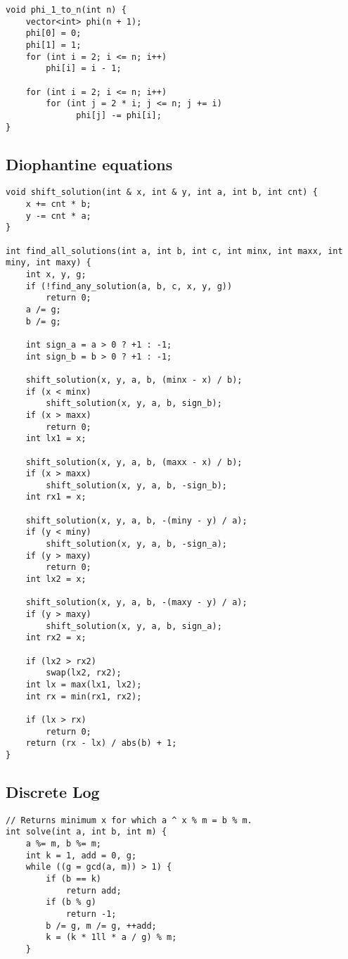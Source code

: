 \documentclass[10pt]{article}
\begin{document}
\begin{multicols*}{2}
\begin{lstlisting}[style=compactcpp]
void phi_1_to_n(int n) {
    vector<int> phi(n + 1);
    phi[0] = 0;
    phi[1] = 1;
    for (int i = 2; i <= n; i++)
        phi[i] = i - 1;

    for (int i = 2; i <= n; i++)
        for (int j = 2 * i; j <= n; j += i)
              phi[j] -= phi[i];
}
\end{lstlisting}

\subsection{Diophantine equations}

\begin{lstlisting}[style=compactcpp]
void shift_solution(int & x, int & y, int a, int b, int cnt) {
    x += cnt * b;
    y -= cnt * a;
}

int find_all_solutions(int a, int b, int c, int minx, int maxx, int miny, int maxy) {
    int x, y, g;
    if (!find_any_solution(a, b, c, x, y, g))
        return 0;
    a /= g;
    b /= g;

    int sign_a = a > 0 ? +1 : -1;
    int sign_b = b > 0 ? +1 : -1;

    shift_solution(x, y, a, b, (minx - x) / b);
    if (x < minx)
        shift_solution(x, y, a, b, sign_b);
    if (x > maxx)
        return 0;
    int lx1 = x;

    shift_solution(x, y, a, b, (maxx - x) / b);
    if (x > maxx)
        shift_solution(x, y, a, b, -sign_b);
    int rx1 = x;

    shift_solution(x, y, a, b, -(miny - y) / a);
    if (y < miny)
        shift_solution(x, y, a, b, -sign_a);
    if (y > maxy)
        return 0;
    int lx2 = x;

    shift_solution(x, y, a, b, -(maxy - y) / a);
    if (y > maxy)
        shift_solution(x, y, a, b, sign_a);
    int rx2 = x;

    if (lx2 > rx2)
        swap(lx2, rx2);
    int lx = max(lx1, lx2);
    int rx = min(rx1, rx2);

    if (lx > rx)
        return 0;
    return (rx - lx) / abs(b) + 1;
}
\end{lstlisting}

\subsection{Discrete Log}

\begin{lstlisting}[style=compactcpp]
// Returns minimum x for which a ^ x % m = b % m.
int solve(int a, int b, int m) {
    a %= m, b %= m;
    int k = 1, add = 0, g;
    while ((g = gcd(a, m)) > 1) {
        if (b == k)
            return add;
        if (b % g)
            return -1;
        b /= g, m /= g, ++add;
        k = (k * 1ll * a / g) % m;
    }


\end{lstlisting}
\end{multicols*}
\end{document}
